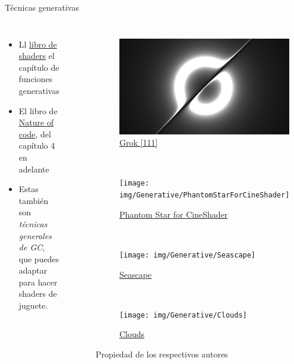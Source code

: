 \begin{frame}{Técnicas generativas}
\begin{columns}
    \begin{itemize}
         \item Ll \href{https://thebookofshaders.com/10/}{libro de shaders} el capítulo de funciones generativas
         \item El libro de \href{https://natureofcode.com/}{Nature of code}, del capítulo 4 en adelante
         \item Estas también son \emph{técnicas generales de GC}, que puedes adaptar para hacer shaders de juguete.
     \end{itemize}
\begin{figure}[htp]
 \centering
 \begin{subfigure}[b]{0.42\textwidth}
   \includegraphics[width=\textwidth]{img/Generative/Grok111}
   \caption{\href{https://www.shadertoy.com/view/wc23Wc}{Grok [111]}}
 \end{subfigure}
~
 \begin{subfigure}[b]{0.42\textwidth}
   \texttt{[image: img/Generative/PhantomStarForCineShader]}
   \caption{\href{https://www.shadertoy.com/view/ttKGDt}{Phantom Star for CineShader}}
 \end{subfigure}
\\
 \begin{subfigure}[b]{0.42\textwidth}
   \texttt{[image: img/Generative/Seascape]}
   \caption{\href{https://www.shadertoy.com/view/Ms2SD1}{Seascape}}
 \end{subfigure}
~
 \begin{subfigure}[b]{0.42\textwidth}
   \texttt{[image: img/Generative/Clouds]}
   \caption{\href{https://www.shadertoy.com/view/XslGRr}{Clouds}}
 \end{subfigure}
 \caption{Propiedad de los respectivos autores}
\end{figure}
\end{columns}
\end{frame}

